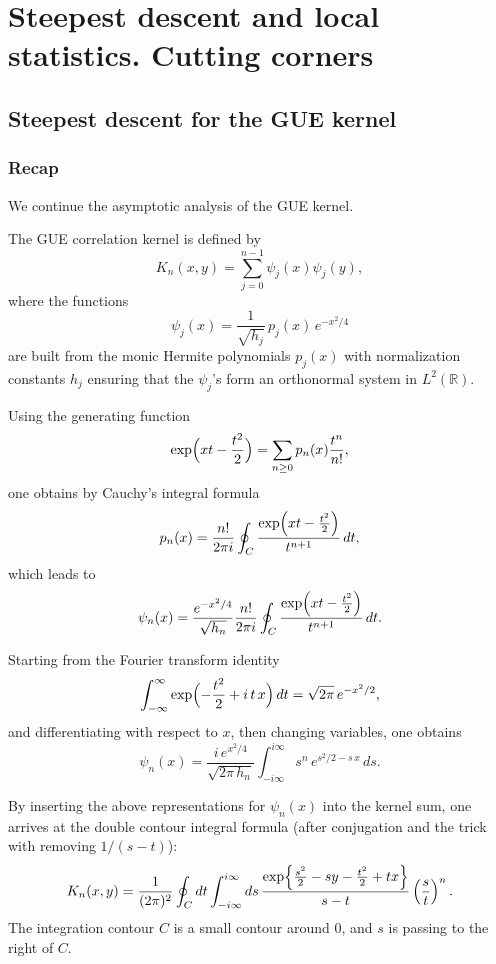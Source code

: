 \documentclass[letterpaper,11pt,oneside,reqno]{book}
\numberwithin{equation}{chapter}  %
\theoremstyle{definition}
\begin{document}
\chapter{Steepest descent and local statistics. Cutting corners}
\label{chap:lecture7}





\section{Steepest descent for the GUE kernel}
\label{lecture7:sec:steepest-descent-GUE}

\subsection{Recap}

We continue the asymptotic analysis of the GUE kernel.

The GUE correlation kernel is defined by
\[
K_n(x,y)=\sum_{j=0}^{n-1}\psi_j(x)\psi_j(y),
\]
where the functions
\[
\psi_j(x)=\frac{1}{\sqrt{h_j}}\,p_j(x)\,e^{-x^2/4}
\]
are built from the monic Hermite polynomials \(p_j(x)\) with normalization constants \(h_j\) ensuring that the \(\psi_j\)'s form an orthonormal system in \(L^2(\mathbb{R})\).

Using the generating function
\[
\exp\Bigl(xt-\frac{t^2}{2}\Bigr)=\sum_{n\ge0}p_n(x)\frac{t^n}{n!},
\]
one obtains by Cauchy’s integral formula
\[
p_n(x)=\frac{n!}{2\pi i}\oint_C\frac{\exp\Bigl(xt-\frac{t^2}{2}\Bigr)}{t^{n+1}}\,dt,
\]
which leads to
\[
\psi_n(x)=\frac{e^{-x^2/4}}{\sqrt{h_n}}\frac{n!}{2\pi i}\oint_C\frac{\exp\Bigl(xt-\frac{t^2}{2}\Bigr)}{t^{n+1}}\,dt.
\]

Starting from the Fourier transform identity
\[
\int_{-\infty}^{\infty} \exp\Bigl(-\frac{t^2}{2}+i\,t\,x\Bigr)\,dt
=\sqrt{2\pi}\,e^{-x^2/2},
\]
and differentiating with respect to \(x\), then changing variables, one obtains
\[
\psi_n(x)=\frac{i\,e^{x^2/4}}{\sqrt{2\pi\,h_n}}
\int_{-i\infty}^{i\infty} s^n\,e^{s^2/2- s\,x}\,ds.
\]

By inserting the above representations for \(\psi_n(x)\) into the kernel sum, one arrives at the double contour integral formula
(after conjugation and the trick with removing $1 / (s-t)$):
\[
K_n(x,y)=\frac{1}{(2\pi)^2}
\oint_C dt\int_{-i\infty}^{i\infty}ds\,
\frac{\exp\Bigl\{\frac{s^2}{2}-sy-\frac{t^2}{2}+tx\Bigr\}}{s-t}\left(\frac{s}{t}\right)^n.
\]
The integration contour $C$ is a small contour around $0$, and
$s$ is passing to the right of $C$.
\end{document}
